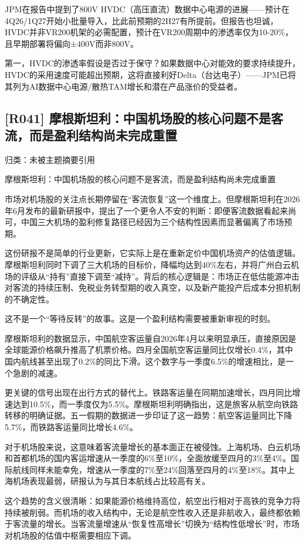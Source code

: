 \documentclass[11pt]{ctexart}
\begin{document}
JPM在报告中提到了800V HVDC（高压直流）数据中心电源的进展——预计在4Q26/1Q27开始小批量导入，比此前预期的2H27有所提前。但报告也坦诚，HVDC并非VR200机架的必需配置，预计在VR200周期中的渗透率仅为10-20\%，且早期部署将偏向±400V而非800V。

第一，HVDC的渗透率假设是否过于保守？如果数据中心对能效的要求持续提升，HVDC的采用速度可能超出预期，这将直接利好Delta（台达电子）——JPM已将其列为AI数据中心电源/散热TAM增长和潜在产品涨价的受益者。

\subsection{[R041] 摩根斯坦利：中国机场股的核心问题不是客流，而是盈利结构尚未完成重置}
{\small\color{refgray}归类：未被主题摘要引用}

摩根斯坦利：中国机场股的核心问题不是客流，而是盈利结构尚未完成重置

市场对机场股的关注点长期停留在“客流恢复”这一个维度上。但摩根斯坦利在2026年6月发布的最新研报中，提出了一个更令人不安的判断：即便客流数据看起来尚可，中国三大机场的盈利修复路径已经因为三个结构性因素而显著偏离了市场预期。

这份研报不是简单的行业更新，它实际上是在重新定价中国机场资产的估值逻辑。摩根斯坦利同时下调了三大机场的目标价，降幅均达到40\%左右，并将广州白云机场的评级从“持有”直接下调至“减持”。背后的核心逻辑是：市场正在低估能源冲击对客流的持续压制、免税业务转型期的收入真空，以及新产能投产后成本分担机制的不确定性。

这不是一个“等待反转”的故事。这是一个盈利结构需要被重新审视的时刻。

摩根斯坦利的数据显示，中国航空客运量自2026年4月以来明显承压，直接原因是全球能源价格飙升推高了机票价格。四月全国航空客运量同比仅增长0.4\%，其中国内航线甚至出现了0.2\%的同比下滑。这个数字与一季度6.5\%的增速相比，是一个急剧的减速。

更关键的信号出现在出行方式的替代上。铁路客运量在同期加速增长，四月同比增速达到10.5\%，而一季度仅为5.5\%。摩根斯坦利明确指出，这是旅客从航空向铁路转移的明确证据。五一假期的数据进一步印证了这一趋势：航空客运量同比下降5.7\%，而铁路客运量同比增长4.6\%。

对于机场股来说，这意味着客流量增长的基本面正在被侵蚀。上海机场、白云机场和首都机场的国内客运增速从一季度的6\%至10\%，全面放缓至四月的3\%至4\%。国际航线同样未能幸免，增速从一季度的7\%至24\%回落至四月的4\%至18\%。其中上海机场表现最弱，研报认为与其日本航线占比较高有关。

这个趋势的含义很清晰：如果能源价格维持高位，航空出行相对于高铁的竞争力将持续被削弱。而机场的收入结构中，无论是航空性收入还是非航收入，最终都依赖于客流量的增长。当客流量增速从“恢复性高增长”切换为“结构性低增长”时，市场对机场股的估值中枢需要相应下调。
\end{document}
